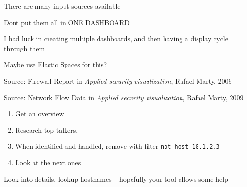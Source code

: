 \documentclass[Screen16to9,17pt]{foils}
\begin{document}
\begin{center}
\end{center}


\begin{list2}
\item There are many input sources available
\item Dont put them all in ONE DASHBOARD
\item I had luck in creating multiple dashboards, and then having a display cycle through them
\item Maybe use Elastic Spaces for this? 
\end{list2}





Source: Firewall Report in \emph{Applied security visualization}, Rafael Marty, 2009




Source: Network Flow Data in \emph{Applied security visualization}, Rafael Marty, 2009





\begin{quote}

\end{quote}

\begin{enumerate}
\item Get an overview
\item Research top talkers,
\item When identified and handled, remove with filter \verb+not host 10.1.2.3+
\item Look at the next ones
\end{enumerate}

Look into details, lookup hostnames -- hopefully your tool allows some help



\end{document}
